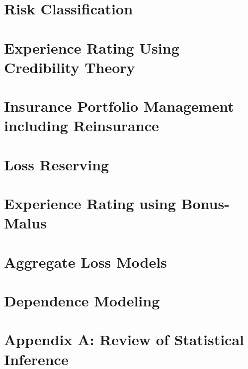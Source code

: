 \documentclass[
]{book}
\begin{document}
\hypertarget{risk-classification}{%
\chapter{Risk Classification}\label{risk-classification}}

\hypertarget{experience-rating-using-credibility-theory}{%
\chapter{Experience Rating Using Credibility Theory}\label{experience-rating-using-credibility-theory}}

\hypertarget{insurance-portfolio-management-including-reinsurance}{%
\chapter{Insurance Portfolio Management including Reinsurance}\label{insurance-portfolio-management-including-reinsurance}}

\hypertarget{loss-reserving}{%
\chapter{Loss Reserving}\label{loss-reserving}}

\hypertarget{experience-rating-using-bonus-malus}{%
\chapter{Experience Rating using Bonus-Malus}\label{experience-rating-using-bonus-malus}}

\hypertarget{aggregate-loss-models-1}{%
\chapter{Aggregate Loss Models}\label{aggregate-loss-models-1}}

\hypertarget{dependence-modeling}{%
\chapter{Dependence Modeling}\label{dependence-modeling}}

\hypertarget{appendix-a-review-of-statistical-inference}{%
\chapter{Appendix A: Review of Statistical Inference}\label{appendix-a-review-of-statistical-inference}}
\end{document}
